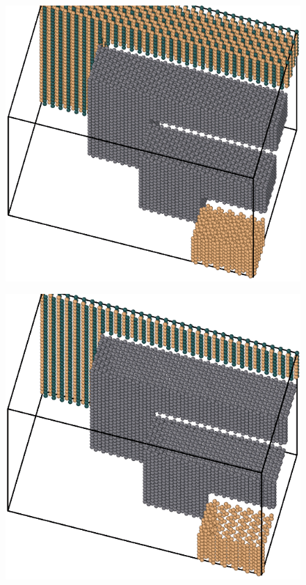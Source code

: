 \begin{figure}[!htb]
  \centering
  \begin{minipage}{.45\textwidth}
    \centering
    \includegraphics[width=1\textwidth]{images/lattice-full.png}
    \label{fig-save-lattice-full}
  \end{minipage}
  \qquad
  \begin{minipage}{.45\textwidth}
    \centering
    \includegraphics[width=1\textwidth]{images/lattice-near-gas.png}
    \label{fig-save-lattice-near-gas}
  \end{minipage}
\end{figure}
